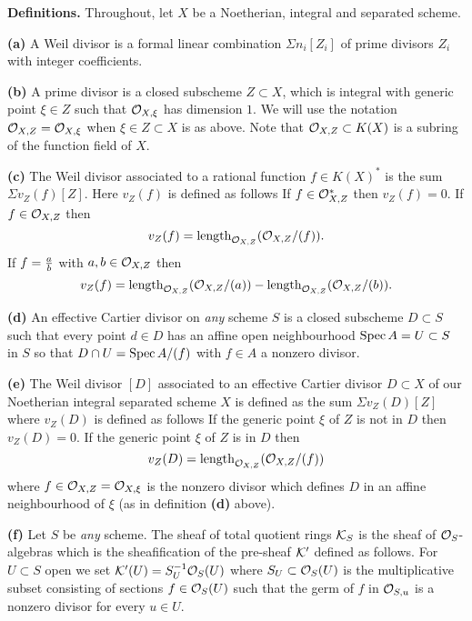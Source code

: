\bigskip\noindent
{\bf Definitions.} Throughout, let $X$ be a Noetherian, integral and
separated scheme.
\item{\bf (a)} A Weil divisor is a formal linear combination
$\Sigma n_i[Z_i]$ of prime divisors $Z_i$ with integer coefficients.
\item{\bf (b)} A prime divisor is a closed subscheme $Z \subset X$,
which is integral with generic point $\xi \in Z$ such that
${\cal O}_{X,\xi}$ has dimension $1$. We will use the notation 
${\cal O}_{X,Z} = {\cal O}_{X,\xi}$
when $\xi \in Z \subset X$ is as above. Note that ${\cal O}_{X,Z} \subset
K(X)$ is a subring of the function field of $X$.
\item{\bf (c)} The Weil divisor associated to a rational function
$f \in K(X)^\ast$ is the sum $\Sigma v_Z(f)[Z]$. Here $v_Z(f)$ is
defined as follows
 If $f \in {\cal O}_{X,Z}^\ast$ then $v_Z(f)=0$.
 If $f \in {\cal O}_{X,Z}$ then 
$$
v_Z(f)=\mathop{\rm length}\nolimits_{{\cal O}_{X,Z}}({\cal O}_{X,Z}/(f)).
$$
 If $f = {a \over b}$ with $a,b \in {\cal O}_{X,Z}$
then 
$$
v_Z(f)=\mathop{\rm length}\nolimits_{{\cal O}_{X,Z}}({\cal O}_{X,Z}/(a)) -
\mathop{\rm length}\nolimits_{{\cal O}_{X,Z}}({\cal O}_{X,Z}/(b)).
$$
\item{\bf (d)} An effective Cartier divisor on {\it any} scheme $S$
is a closed subscheme $D \subset S$ such that every point $d\in D$
has an affine open neighbourhood $\mathop{\rm Spec} A = U \subset S$ in $S$
so that $D \cap U = \mathop{\rm Spec} A/(f)$ with $f \in A$ a nonzero divisor.
\item{\bf (e)} The Weil divisor $[D]$ associated to an effective
Cartier divisor $D \subset X$ of our Noetherian integral separated
scheme $X$ is defined as the sum $\Sigma v_Z(D)[Z]$ where
$v_Z(D)$ is defined as follows
 If the generic point $\xi$ of $Z$ is not in $D$
then $v_Z(D)=0$.
 If the generic point $\xi$ of $Z$ is in $D$
then 
$$
v_Z(D)=\mathop{\rm length}\nolimits_{{\cal O}_{X,Z}}({\cal O}_{X,Z}/(f))
$$
where $f \in {\cal O}_{X,Z}={\cal O}_{X,\xi}$ is the nonzero divisor
which defines $D$ in an affine neighbourhood of $\xi$ (as in definition
{\bf (d)} above).
\item{\bf (f)} Let $S$ be {\it any} scheme. The sheaf of total quotient
rings ${\cal K}_S$ is the sheaf of ${\cal O}_S$-algebras which is
the sheafification of the pre-sheaf ${\cal K}'$ defined as follows.
For $U \subset S$ open we set ${\cal K}'(U) = S_U^{-1}{\cal O}_S(U)$
where $S_U \subset {\cal O}_S(U)$ is the multiplicative subset
consisting of sections $f \in {\cal O}_S(U)$ such that the germ
of $f$ in ${\cal O}_{S,u}$ is a nonzero divisor for every $u\in U$.
